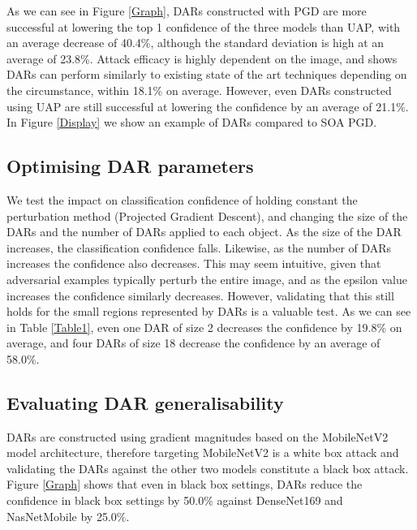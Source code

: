 \documentclass{article}
\begin{document}
As we can see in Figure \ref{Graph}, DARs constructed with PGD are more successful at lowering the top 1 confidence of the three models than UAP, with an average decrease of 40.4\%, although the standard deviation is high at an average of 23.8\%. Attack efficacy is highly dependent on the image, and shows DARs can perform similarly to existing state of the art techniques depending on the circumstance, within 18.1\% on average. However, even DARs constructed using UAP are still successful at lowering the confidence by an average of 21.1\%. In Figure \ref{Display} we show an example of DARs compared to SOA PGD.  

\subsection{Optimising DAR parameters}

We test the impact on classification confidence of holding constant the perturbation method (Projected Gradient Descent), and changing the size of the DARs and the number of DARs applied to each object. As the size of the DAR increases, the classification confidence falls. Likewise, as the number of DARs increases the confidence also decreases. This may seem intuitive, given that adversarial examples typically perturb the entire image, and as the epsilon value increases the confidence similarly decreases. However, validating that this still holds for the small regions represented by DARs is a valuable test. As we can see in Table \ref{Table1}, even one DAR of size 2 decreases the confidence by 19.8\% on average, and four DARs of size 18 decrease the confidence by an average of 58.0\%. 

\subsection{Evaluating DAR generalisability}

DARs are constructed using gradient magnitudes based on the MobileNetV2 model architecture, therefore targeting MobileNetV2 is a white box attack and validating the DARs against the other two models constitute a black box attack. Figure \ref{Graph} shows that even in black box settings, DARs reduce the confidence in black box settings by 50.0\% against DenseNet169 and NasNetMobile by 25.0\%. 
\end{document}
